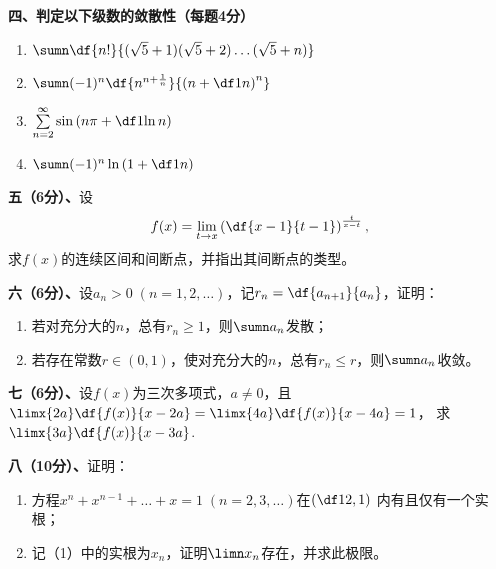 {\bf 四、判定以下级数的敛散性（每题4分）}
\begin{enumerate}[(1)]
  \setlength{\itemindent}{1cm}
  \item $\sumn\df{n!}{{(\sqrt5+1)}{(\sqrt5+2)}\ldots{(\sqrt5+n)}}$
  \item $\sumn(-1)^n\df{n^{n+\frac1n}}{\left(n+\df1n\right)^n}$
  \item $\sum\limits_{n=2}^{\infty}\sin\left(n\pi+\df1{\ln n}\right)$
  \item $\sumn(-1)^n\ln\left(1+\df1n\right)$
\end{enumerate}


{\bf 五（6分）、}设
$$f(x)=\lim\limits_{t\to x}\left(\df{x-1}{t-1}\right)^{\frac{t}{x-t}},$$
求$f(x)$的连续区间和间断点，并指出其间断点的类型。

{\bf 六（6分）、}设$a_n>0\;(n=1,2,\ldots)$，记$r_n=\df{a_{n+1}}{a_n}$，证明：
\begin{enumerate}[(1)]
  \setlength{\itemindent}{1cm}
  \item 若对充分大的$n$，总有$r_n\geq 1$，则$\sumn a_n$发散；
  \item 若存在常数$r\in(0,1)$，使对充分大的$n$，总有$r_n\leq r$，则$\sumn a_n$收敛。
\end{enumerate}

{\bf 七（6分）、}设$f(x)$为三次多项式，$a\ne 0$，且
$\limx{2a}\df{f(x)}{x-2a}=\limx{4a}\df{f(x)}{x-4a}=1$，
求$\limx{3a}\df{f(x)}{x-3a}$.

{\bf 八（10分）、}证明：
\begin{enumerate}[(1)]
  \setlength{\itemindent}{1cm}
  \item 方程$x^n+x^{n-1}+\ldots+x=1\;(n=2,3,\ldots)$在$\left(\df12,1\right)$
  内有且仅有一个实根；
  \item 记（1）中的实根为$x_n$，证明$\limn x_n$存在，并求此极限。
\end{enumerate}

